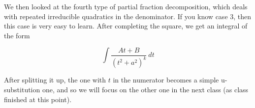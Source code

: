 \documentclass{article}
\begin{document}
\newpage

We then looked at the fourth type of partial fraction decomposition, which deals with repeated irreducible quadratics in the denominator. If you know case 3, then this case is very easy to learn. After completing the square, we get an integral of the form

\[\int\frac{At+B}{(t^2+a^2)^k}\ dt\]

\vspace{10pt}

After splitting it up, the one with $t$ in the numerator becomes a simple u-substitution one, and so we will focus on the other one in the next class (as class finished at this point).
\end{document}

